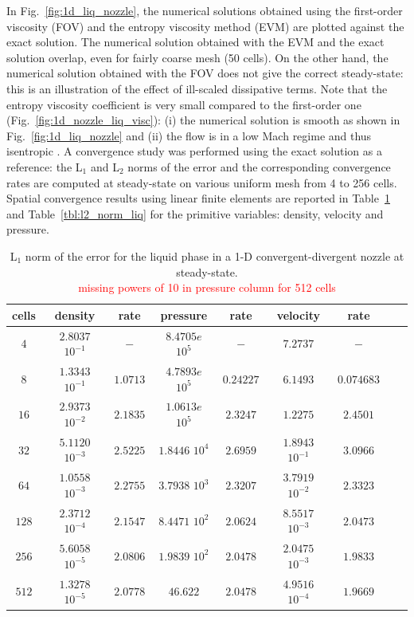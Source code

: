 \documentclass[preprint,10pt]{elsarticle}
\newcommand{\fig}[1]{Fig.~\ref{#1}}                      %
\newcommand{\tbl}[1]{Table~\ref{#1}}                     %
\newcommand{\tcr}[1]{\textcolor{red}{#1}}
\begin{document}
%
In \fig{fig:1d_liq_nozzle}, the numerical solutions obtained using the first-order viscosity (FOV) and the entropy viscosity method (EVM) are plotted against the exact solution. The numerical solution obtained with the EVM and the exact solution overlap, even for fairly coarse mesh (50 cells).
On the other hand, the numerical solution obtained with the FOV does not give the correct steady-state: this is an illustration of the effect of ill-scaled dissipative terms. 
%
Note that the entropy viscosity coefficient is very small compared to the first-order one (\fig{fig:1d_nozzle_liq_visc}): (i) the numerical solution is smooth as shown in \fig{fig:1d_liq_nozzle} and (ii) the flow is in a low Mach regime and thus isentropic . A convergence study was performed using the exact solution as a reference: the L$_1$ and L$_2$ norms of the error and the corresponding convergence rates are computed at steady-state on various uniform mesh from 4 to 256 cells. Spatial convergence results using linear finite elements are reported in \tbl{tbl:l1_norm_liq} and \tbl{tbl:l2_norm_liq} for the primitive variables: density, velocity and pressure.
\begin{table}[H]
\begin{center}
 \caption{\label{tbl:l1_norm_liq} L$_1$ norm of the error for the liquid phase in a 1-D convergent-divergent nozzle at steady-state.\\ \tcr{missing powers of 10 in pressure column for 512 cells} }
 \begin{tabular}{|c|c|c|c|c|c|c|c|c|}
 \hline
cells & density            & rate     & pressure           & rate      & velocity           & rate       \\ \hline
$4$   & $2.8037$ $10^{-1}$ & $-$      & $8.4705e$ $10^{5}$ & $-$       & $7.2737$           & $-$        \\ \hline
$8$   & $1.3343$ $10^{-1}$ & $1.0713$ & $4.7893e$ $10^{5}$ & $0.24227$ & $6.1493$           & $0.074683$ \\ \hline
$16$  & $2.9373$ $10^{-2}$ & $2.1835$ & $1.0613e$ $10^{5}$ & $2.3247$  & $1.2275$           & $2.4501$   \\ \hline
$32$  & $5.1120$ $10^{-3}$ & $2.5225$ & $1.8446$ $10^{4}$  & $2.6959$  & $1.8943$ $10^{-1}$ & $3.0966$   \\ \hline
$64$  & $1.0558$ $10^{-3}$ & $2.2755$ & $3.7938$ $10^{3}$  & $2.3207$  & $3.7919$ $10^{-2}$ & $2.3323$   \\ \hline
$128$ & $2.3712$ $10^{-4}$ & $2.1547$ & $8.4471$ $10^{2}$  & $2.0624$  & $8.5517$ $10^{-3}$ & $2.0473$   \\ \hline
$256$ & $5.6058$ $10^{-5}$ & $2.0806$ & $1.9839$ $10^{2}$  & $2.0478$  & $2.0475$ $10^{-3}$ & $1.9833$   \\ \hline
$512$ & $1.3278$ $10^{-5}$ & $2.0778$ & $46.622$           & $2.0478$  & $4.9516$ $10^{-4}$ & $1.9669$   \\ \hline
\end{tabular}
\end{center}
\end{table}
\end{document}
